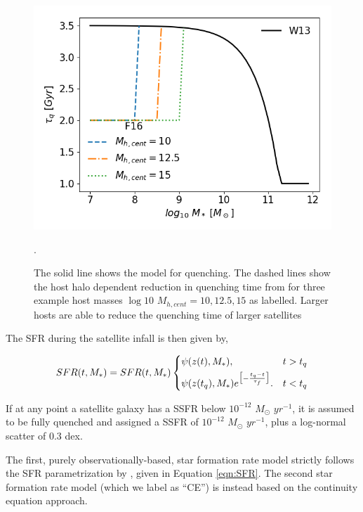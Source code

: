 \begin{figure}
    \centering
    \includegraphics[width = \linewidth]{Figures/Chapter3/Fig4.png}
    \caption{The solid line shows the \citet[][W13]{Wetzel2013GalaxyUniverse} model for quenching. The dashed lines show the host halo dependent reduction in quenching time from \citet[][F16]{Fillingham2016UnderStripping} for three example host masses $\log10$ $M_{h, cent} = 10, 12.5, 15$ as labelled. Larger hosts are able to reduce the quenching time of larger satellites}.
    \label{fig:QuenchFig}
\end{figure}

The SFR during the satellite infall is then given by,

\begin{equation}
\label{eqn:SFR_Quench}
SFR(t, M_*) = SFR(t, M_*)
\begin{dcases}
\psi(z(t), M_*), & \text{} t > t_q \\
\psi(z(t_q), M_*)e^{\big[-\frac{t_q-t}{\tau_f}\big]}. & \text{} t < t_q
\end{dcases}
\end{equation}

If at any point a satellite galaxy has a SSFR below $10^{-12}$ $M_{\odot}$ $yr^{-1}$, it is assumed to be fully quenched and assigned a SSFR of $10^{-12}$ $M_{\odot}$ $yr^{-1}$, plus a log-normal scatter of 0.3 dex.


The first, purely observationally-based, star formation rate model strictly follows the SFR parametrization by \citet[][T16 hereafter]{Tomczak2016THE4}, given in Equation \ref{eqn:SFR}. The second star formation rate model (which we label as ``CE'') is instead based on the continuity equation approach. 

